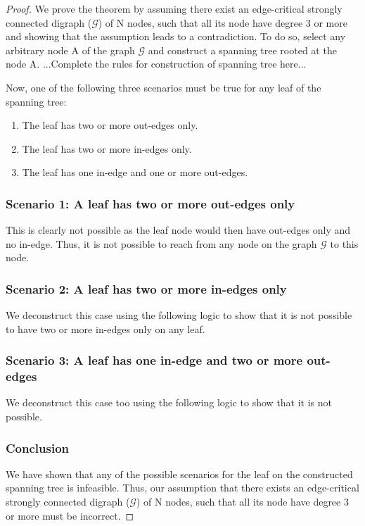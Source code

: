 \documentclass[runningheads]{llncs}
\begin{document}
\begin{proof}
We prove the theorem by assuming there exist an edge-critical strongly connected digraph ($\mathcal{G}$) of N nodes, such that all its node have degree 3 or more and showing that the assumption leads to a contradiction. To do so, select any arbitrary node A of the graph $\mathcal{G}$ and construct a spanning tree rooted at the node A. ...Complete the rules for construction of spanning tree here...

\vspace{0.5em} %
\noindent Now, one of the following three scenarios must be true for any leaf of the spanning tree:
\begin{enumerate}
    \item The leaf has two or more out-edges only.
    \item The leaf has two or more in-edges only.
    \item The leaf has one in-edge and one or more out-edges.
\end{enumerate}

\subsubsection{Scenario 1: A leaf has two or more out-edges only} This is clearly not possible as the leaf node would then have out-edges only and no in-edge. Thus, it is not possible to reach from any node on the graph $\mathcal{G}$ to this node.

\subsubsection{Scenario 2: A leaf has two or more in-edges only} We deconstruct this case using the following logic to show that it is not possible to have two or more in-edges only on any leaf.

\subsubsection{Scenario 3: A leaf has one in-edge and two or more out-edges} We deconstruct this case too using the following logic to show that it is not possible.

\subsubsection{Conclusion} We have shown that any of the possible scenarios for the leaf on the constructed spanning tree is infeasible. Thus, our assumption that there exists an edge-critical strongly connected digraph ($\mathcal{G}$) of N nodes, such that all its node have degree 3 or more must be incorrect.
\end{proof}
\end{document}
